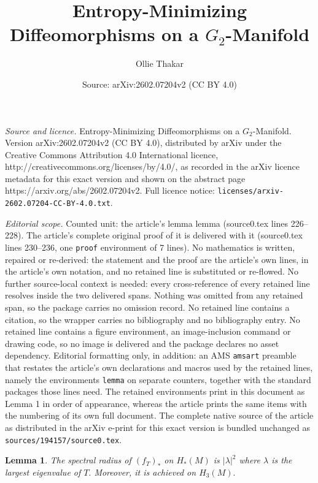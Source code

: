 \documentclass[10pt,a4paper]{amsart}
\title{Entropy-Minimizing Diffeomorphisms on a $G_2$-Manifold}
\author{Ollie Thakar}
\date{Source: arXiv:2602.07204v2 (CC BY 4.0)}
\newtheorem{lemma}{Lemma}
\begin{document}
\maketitle

\noindent\emph{Source and licence.} Entropy-Minimizing Diffeomorphisms on a $G_2$-Manifold. Version arXiv:2602.07204v2 (CC BY 4.0), distributed by arXiv under the Creative Commons Attribution 4.0 International licence, http://creativecommons.org/licenses/by/4.0/, as recorded in the arXiv licence metadata for this exact version and shown on the abstract page https://arxiv.org/abs/2602.07204v2. Full licence notice: \texttt{licenses/arxiv-2602.07204-CC-BY-4.0.txt}.\par\smallskip

\noindent\textit{Editorial scope.} Counted unit: the article's lemma lemma (source0.tex lines 226--228). The article's complete original proof of it is delivered with it (source0.tex lines 230--236, one \texttt{proof} environment of 7 lines). No mathematics is written, repaired or re-derived: the statement and the proof are the article's own lines, in the article's own notation, and no retained line is substituted or re-flowed.  No further source-local context is needed: every cross-reference of every retained line resolves inside the two delivered spans.  Nothing was omitted from any retained span, so the package carries no omission record.  No retained line contains a citation, so the wrapper carries no bibliography and no bibliography entry.  No retained line contains a figure environment, an image-inclusion command or drawing code, so no image is delivered and the package declares no asset dependency.  Editorial formatting only, in addition: an AMS \texttt{amsart} preamble that restates the article's own declarations and macros used by the retained lines, namely the environments \texttt{lemma} on separate counters, together with the standard packages those lines need.  The retained environments print in this document as Lemma 1 in order of appearance, whereas the article prints the same items with the numbering of its own full document.  The complete native source of the article as distributed in the arXiv e-print for this exact version is bundled unchanged as \texttt{sources/194157/source0.tex}.
\begin{lemma}
    The spectral radius of $(f_T)_*$ on $H_*(M)$ is $|\lambda|^2$ where $\lambda$ is the largest eigenvalue of $T.$ Moreover, it is achieved on $H_3(M).$
\end{lemma}
\end{document}
